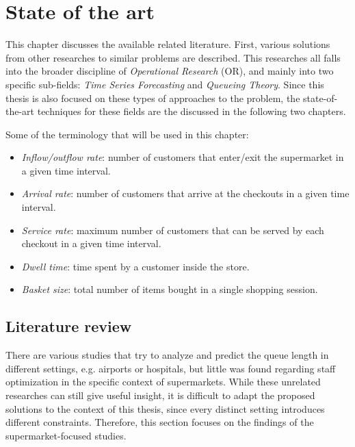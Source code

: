 \chapter{State of the art}
\label{cha:state_of_the_art}

This chapter discusses the available related literature. First, various solutions from other researches to similar problems are described. This researches all falls into the broader discipline of \emph{Operational Research} (OR), and mainly into two specific sub-fields: \emph{Time Series Forecasting} and \emph{Queueing Theory}. Since this thesis is also focused on these types of approaches to the problem, the state-of-the-art techniques for these fields are the discussed in the following two chapters.

Some of the terminology that will be used in this chapter:
\begin{itemize}
  \item \emph{Inflow/outflow rate}: number of customers that enter/exit the supermarket in a given time interval.
  \item \emph{Arrival rate}: number of customers that arrive at the checkouts in a given time interval.
  \item \emph{Service rate}: maximum number of customers that can be served by each checkout in a given time interval.
  \item \emph{Dwell time}: time spent by a customer inside the store.
  \item \emph{Basket size}: total number of items bought in a single shopping session.
\end{itemize}

\section{Literature review}
\label{sec:literature_review}

There are various studies that try to analyze and predict the queue length in different settings, e.g. airports or hospitals, but little was found regarding staff optimization in the specific context of supermarkets. While these unrelated researches can still give useful insight, it is difficult to adapt the proposed solutions to the context of this thesis, since every distinct setting introduces different constraints. Therefore, this section focuses on the findings of the supermarket-focused studies.

